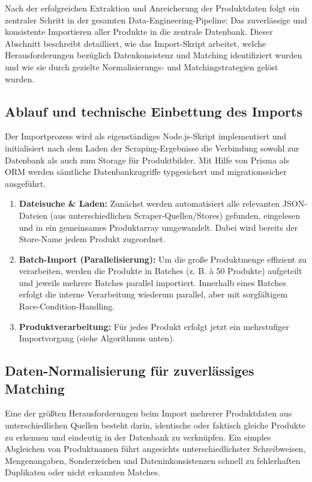 \documentclass[12pt, a4paper]{report} %
\begin{document}
Nach der erfolgreichen Extraktion und Anreicherung der Produktdaten folgt ein zentraler Schritt in der gesamten Data-Engineering-Pipeline: Das zuverlässige und konsistente Importieren aller Produkte in die zentrale Datenbank. Dieser Abschnitt beschreibt detailliert, wie das Import-Skript arbeitet, welche Herausforderungen bezüglich Datenkonsistenz und Matching identifiziert wurden und wie sie durch gezielte Normalisierungs- und Matchingstrategien gelöst wurden.

\subsection{Ablauf und technische Einbettung des Imports}

Der Importprozess wird als eigenständiges Node.js-Skript implementiert und initialisiert nach dem Laden der Scraping-Ergebnisse die Verbindung sowohl zur Datenbank als auch zum Storage für Produktbilder. Mit Hilfe von Prisma als ORM werden sämtliche Datenbankzugriffe typgesichert und migrationssicher ausgeführt.

\begin{enumerate}
    \item \textbf{Dateisuche \& Laden:} Zunächst werden automatisiert alle relevanten JSON-Dateien (aus unterschiedlichen Scraper-Quellen/Stores) gefunden, eingelesen und in ein gemeinsames Produktarray umgewandelt. Dabei wird bereits der Store-Name jedem Produkt zugeordnet.
    \item \textbf{Batch-Import (Parallelisierung):} Um die große Produktmenge effizient zu verarbeiten, werden die Produkte in Batches (z. B. à 50 Produkte) aufgeteilt und jeweils mehrere Batches parallel importiert. Innerhalb eines Batches erfolgt die interne Verarbeitung wiederum parallel, aber mit sorgfältigem Race-Condition-Handling.
    \item \textbf{Produktverarbeitung:} Für jedes Produkt erfolgt jetzt ein mehrstufiger Importvorgang (siehe Algorithmus unten).
\end{enumerate}

\subsection{Daten-Normalisierung für zuverlässiges Matching}

Eine der größten Herausforderungen beim Import mehrerer Produktdaten aus unterschiedlichen Quellen besteht darin, identische oder faktisch gleiche Produkte zu erkennen und eindeutig in der Datenbank zu verknüpfen. Ein simples Abgleichen von Produktnamen führt angesichts unterschiedlichster Schreibweisen, Mengenangaben, Sonderzeichen und Dateninkonsistenzen schnell zu fehlerhaften Duplikaten oder nicht erkannten Matches.
\end{document}

